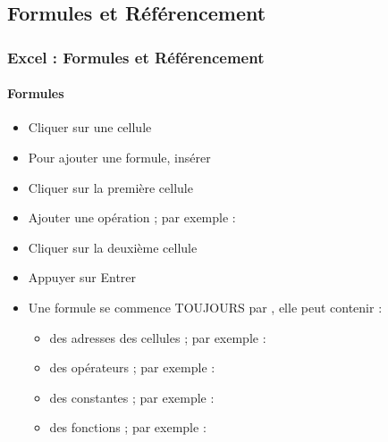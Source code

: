 \documentclass[xcolor=table, usenames,dvipsnames]{beamer}
\begin{document}
\subsection{Formules et Référencement}

\begin{frame}
\frametitle{Excel : Formules et Référencement}
\framesubtitle{Formules}

\begin{minipage}{0.60\textwidth}
	\begin{itemize}
		\item Cliquer sur une cellule 
		\item Pour ajouter une formule, insérer \keyword{=}
		\item Cliquer sur la première cellule 
		\item Ajouter une opération ; par exemple : \expword{+}
		\item Cliquer sur la deuxième cellule 
		\item Appuyer sur Entrer
	\end{itemize}
\end{minipage}
%
\begin{minipage}{0.39\textwidth}
\end{minipage}

\begin{itemize}
	\item Une formule se commence TOUJOURS par \keyword{=}, elle peut contenir :
	\begin{itemize}
		\item des adresses des cellules ; par exemple : 
		\item des opérateurs ; par exemple : \expword{+}
		\item des constantes ; par exemple : 
		\item des fonctions ; par exemple :  
	\end{itemize}
\end{itemize}

\end{frame}
\end{document}
